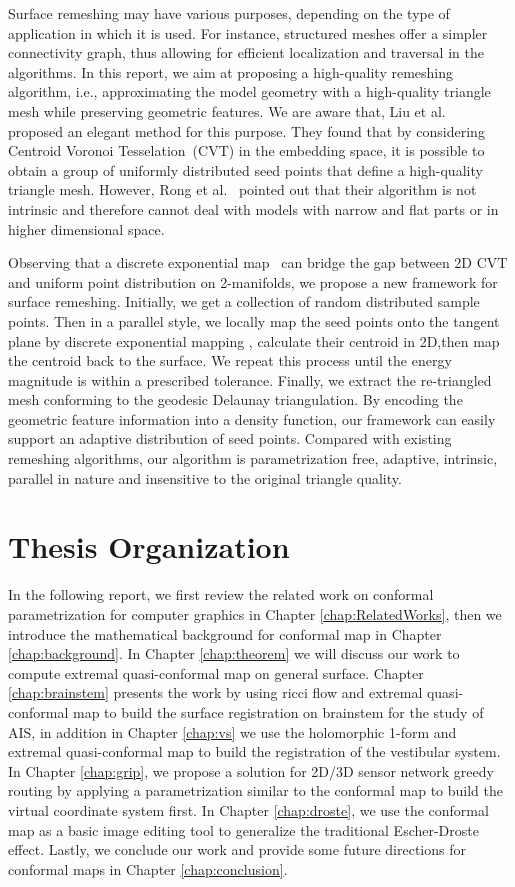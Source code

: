 Surface remeshing may have various purposes, depending on the type of application in which it is used.
For instance, structured meshes offer a simpler connectivity graph,
thus allowing for efficient localization and traversal
in the algorithms. In this report, we aim at proposing a high-quality remeshing algorithm,
i.e., approximating the model geometry with a high-quality triangle mesh
while preserving geometric features. We are aware that,
Liu et al.~\cite{Liu:2009:CVT} proposed an elegant method
for this purpose. They found that by considering
Centroid Voronoi Tesselation~(CVT) in the embedding space,
it is possible to obtain a group of uniformly distributed seed points
that define a high-quality triangle mesh. However,
Rong et al.~\cite{Rong:2011:CVT} pointed out that their algorithm
is not intrinsic and therefore cannot deal with models with narrow
and flat parts or in higher dimensional space.

Observing that a discrete exponential map~\cite{Schmidt:2006} can
bridge the gap between 2D CVT and uniform point distribution on
2-manifolds, we propose a new framework for surface remeshing.
Initially, we get a collection of random distributed sample points.
Then in a parallel style, we locally map the
seed points onto the tangent plane by discrete exponential mapping
, calculate their centroid in 2D,then map the centroid back to the surface.
We repeat this process until the energy magnitude is within a prescribed tolerance.
Finally, we extract the re-triangled mesh conforming to the geodesic
Delaunay triangulation. By encoding the geometric feature
information into a density function, our framework can easily
support an adaptive distribution of seed points. Compared with
existing remeshing algorithms, our algorithm is parametrization
 free, adaptive, intrinsic, parallel in nature and insensitive to the
original triangle quality.
\section{Thesis Organization}

In the following report, we first review the related work on conformal parametrization for computer graphics in Chapter \ref{chap:RelatedWorks}, then we introduce the mathematical background for conformal map in Chapter \ref{chap:background}. In Chapter \ref{chap:theorem} we will discuss our work to compute extremal quasi-conformal map on general surface.
Chapter \ref{chap:brainstem} presents the work by using ricci flow and extremal quasi-conformal map to build the surface registration on brainstem for the study of AIS, in addition in Chapter \ref{chap:vs} we use the holomorphic 1-form and extremal quasi-conformal map to build the registration of the vestibular system.
In Chapter \ref{chap:grip}, we propose a solution for 2D/3D sensor network greedy routing by applying a parametrization similar to the conformal map to build the
virtual coordinate system first. In Chapter \ref{chap:droste}, we use the conformal map as a basic image editing tool to generalize the traditional Escher-Droste effect.
Lastly, we conclude our work and provide some future directions for conformal maps in Chapter \ref{chap:conclusion}.
